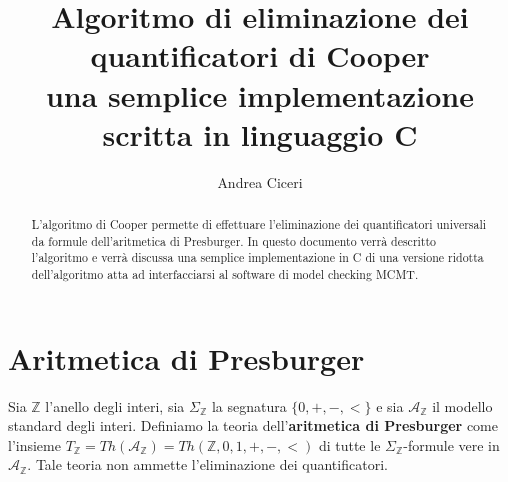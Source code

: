 \documentclass[11pt,letterpaper,twoside]{article}
\begin{document}
\newcommand{\src}[2]{\inputminted[linenos, mathescape=true, firstline={#1},
  lastline={#2}]{C}{../cooper.c}}
\newcommand{\inline}[1]{\texttt{#1}}


\newcommand{\srcf}[1]{\pyc{print(lines("#1"))}}

\title{%
  Algoritmo di eliminazione dei quantificatori di Cooper\\
  \large una semplice implementazione scritta in linguaggio C}
\author{Andrea Ciceri}
\maketitle

\begin{abstract}
  L'algoritmo di Cooper permette di effettuare l'eliminazione dei quantificatori
  universali da formule dell'aritmetica di Presburger. In questo documento
  verrà descritto l'algoritmo e verrà discussa una semplice implementazione
  in C di una versione ridotta dell'algoritmo atta ad interfacciarsi al
  software di model checking MCMT\autocite{mcmt}.  
\end{abstract}

\section{Aritmetica di Presburger}
Sia $\mathbb{Z}$ l'anello degli interi, sia $\Sigma_{\mathbb{Z}}$ la segnatura
$\{0, +, -, <\}$ e sia $\mathcal{A}_{\mathbb{Z}}$ il modello standard degli
interi.
Definiamo la teoria dell'\textbf{aritmetica di Presburger} come l'insieme
$T_{\mathbb{Z}}=Th(\mathcal{A}_{\mathbb{Z}})=Th(\mathbb{Z}, 0, 1, +, -, <)$ di
tutte le $\Sigma_{\mathbb{Z}}$-formule vere in $\mathcal{A}_{\mathbb{Z}}$.
Tale teoria non ammette l'eliminazione dei quantificatori.
\end{document}
